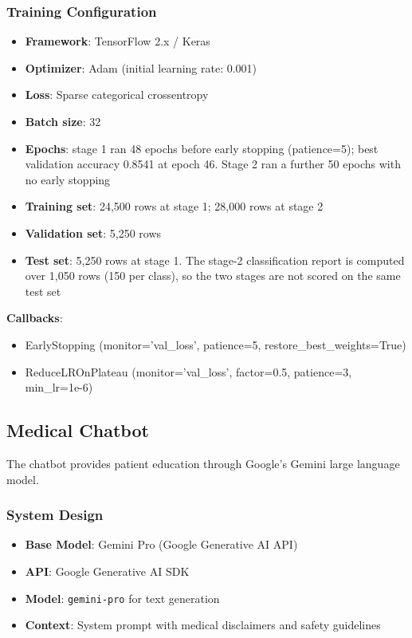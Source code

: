\documentclass[ai,article,submit,pdftex,moreauthors]{Definitions/mdpi}
\begin{document}
\subsubsection{Training Configuration}
\begin{itemize}[leftmargin=*, itemsep=2pt]
    \item \textbf{Framework}: TensorFlow 2.x / Keras
    \item \textbf{Optimizer}: Adam (initial learning rate: 0.001)
    \item \textbf{Loss}: Sparse categorical crossentropy
    \item \textbf{Batch size}: 32
    \item \textbf{Epochs}: stage 1 ran 48 epochs before early stopping (patience=5); best validation accuracy 0.8541 at epoch 46. Stage 2 ran a further 50 epochs with no early stopping
    \item \textbf{Training set}: 24,500 rows at stage 1; 28,000 rows at stage 2
    \item \textbf{Validation set}: 5,250 rows
    \item \textbf{Test set}: 5,250 rows at stage 1. The stage-2 classification report is computed over 1,050 rows (150 per class), so the two stages are not scored on the same test set
\end{itemize}

\textbf{Callbacks}:
\begin{itemize}[leftmargin=*, itemsep=2pt]
    \item EarlyStopping (monitor='val\_loss', patience=5, restore\_best\_weights=True)
    \item ReduceLROnPlateau (monitor='val\_loss', factor=0.5, patience=3, min\_lr=1e-6)
\end{itemize}

\subsection{Medical Chatbot}

The chatbot provides patient education through Google's Gemini large language model.

\subsubsection{System Design}
\begin{itemize}[leftmargin=*, itemsep=2pt]
    \item \textbf{Base Model}: Gemini Pro (Google Generative AI API)
    \item \textbf{API}: Google Generative AI SDK
    \item \textbf{Model}: \texttt{gemini-pro} for text generation
    \item \textbf{Context}: System prompt with medical disclaimers and safety guidelines
\end{itemize}
\end{document}
